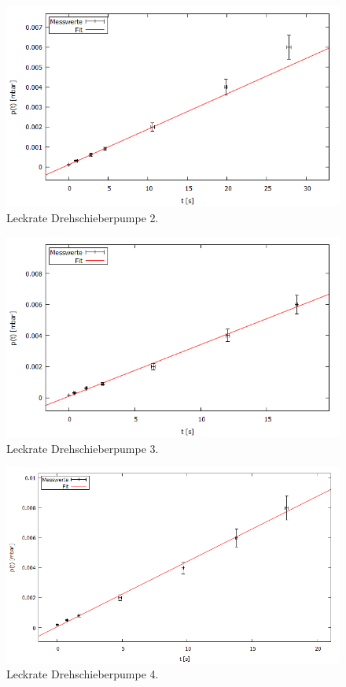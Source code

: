 \begin{figure}[H]
  \centering
  \includegraphics[width=14cm]{bilder/leckratefit2.png}
  \caption{Leckrate Drehschieberpumpe 2.}
  \label{leckrate2}
\end{figure}
\begin{figure}[H]
  \centering
  \includegraphics[width=14cm]{bilder/leckratefit3.png}
  \caption{Leckrate Drehschieberpumpe 3.}
  \label{leckrate3}
\end{figure}
\begin{figure}[H]
  \centering
  \includegraphics[width=14cm]{bilder/leckratefit4.png}
  \caption{Leckrate Drehschieberpumpe 4.}
  \label{leckrate4}
\end{figure}

